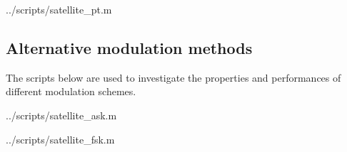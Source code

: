 \begin{lstinputlisting}[language=Octave]{../scripts/satellite_pt.m}
\end{lstinputlisting}


\subsection{Alternative modulation methods}
The scripts below are used to investigate the properties and performances of different modulation schemes.

\begin{lstinputlisting}[language=Octave]{../scripts/satellite_ask.m}
\end{lstinputlisting}

\begin{lstinputlisting}[language=Octave]{../scripts/satellite_fsk.m}
\end{lstinputlisting}
